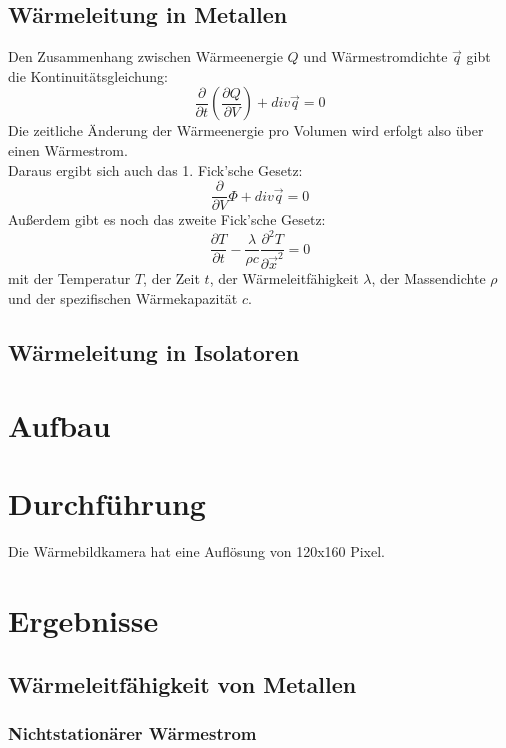 \documentclass[12pt,a4paper,twopage]{article}
\begin{document}
\subsection{Wärmeleitung in Metallen}
Den Zusammenhang zwischen Wärmeenergie $Q$ und Wärmestromdichte $\vec{q}$ gibt die Kontinuitätsgleichung:
$$\frac{\partial}{\partial t}\left(\frac{\partial Q}{\partial V}\right) + div \vec{q}=0$$
Die zeitliche Änderung der Wärmeenergie pro Volumen wird erfolgt also über einen Wärmestrom.\\
Daraus ergibt sich auch das 1. Fick'sche Gesetz:
$$\frac{\partial}{\partial V}\Phi + div \vec{q}=0$$
Außerdem gibt es noch das zweite Fick'sche Gesetz:
$$\frac{\partial T}{\partial t}-\frac{\lambda}{\rho c	}\frac{\partial^2 T}{\partial \vec{x}^2}=0$$
mit der Temperatur $T$, der Zeit $t$, der Wärmeleitfähigkeit $\lambda$, der Massendichte $\rho$ und der spezifischen Wärmekapazität $c$.

\subsection{Wärmeleitung in Isolatoren}

\section{Aufbau}

\section{Durchführung}
Die Wärmebildkamera hat eine Auflösung von 120x160 Pixel.

\section{Ergebnisse}
\subsection{Wärmeleitfähigkeit von Metallen}
\subsubsection{Nichtstationärer Wärmestrom}
\end{document}
